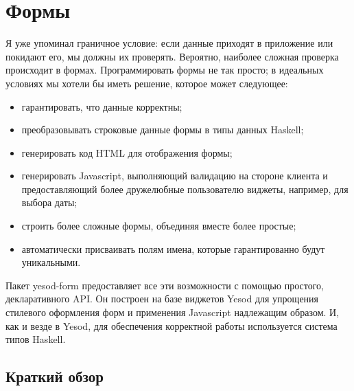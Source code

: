 \chapter{Формы}
Я уже упоминал граничное условие: если данные приходят в приложение или
покидают его, мы должны их проверять. Вероятно, наиболее сложная проверка
происходит в формах.  Программировать формы не так просто; в идеальных
условиях мы хотели бы иметь решение, которое может следующее:

\begin{itemize}
    \item гарантировать, что данные корректны;
    \item преобразовывать строковые данные формы в типы данных Haskell;
    \item генерировать код HTML для отображения формы;
    \item генерировать Javascript, выполняющий валидацию на стороне клиента и
        предоставляющий более дружелюбные пользователю виджеты, например, для
        выбора даты;
    \item строить более сложные формы, объединяя вместе более простые;
    \item автоматически присваивать полям имена, которые гарантированно будут
        уникальными.
\end{itemize}

Пакет yesod-form предоставляет все эти возможности с помощью простого,
декларативного API. Он построен на базе виджетов Yesod для упрощения стилевого
оформления форм и применения Javascript надлежащим образом. И, как и везде в
Yesod, для обеспечения корректной работы используется система типов Haskell.

\section{Краткий обзор}


